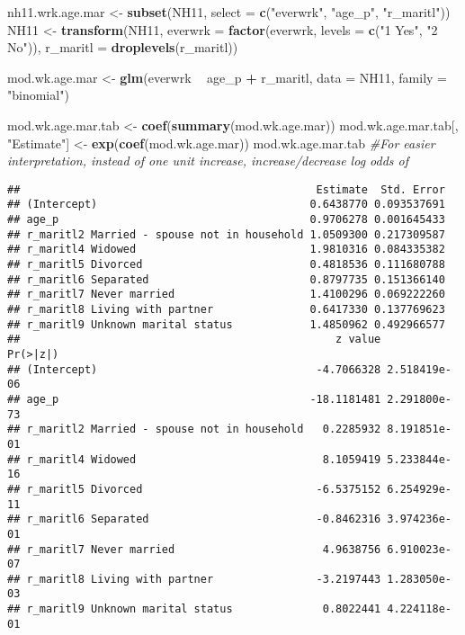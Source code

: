 \documentclass[]{article}
\newenvironment{Shaded}{\begin{snugshade}}{\end{snugshade}}
\newcommand{\KeywordTok}[1]{\textcolor[rgb]{0.13,0.29,0.53}{\textbf{#1}}}
\newcommand{\DataTypeTok}[1]{\textcolor[rgb]{0.13,0.29,0.53}{#1}}
\newcommand{\StringTok}[1]{\textcolor[rgb]{0.31,0.60,0.02}{#1}}
\newcommand{\CommentTok}[1]{\textcolor[rgb]{0.56,0.35,0.01}{\textit{#1}}}
\newcommand{\OperatorTok}[1]{\textcolor[rgb]{0.81,0.36,0.00}{\textbf{#1}}}
\newcommand{\NormalTok}[1]{#1}
\begin{document}
\begin{Shaded}
\begin{Highlighting}[]
\NormalTok{nh11.wrk.age.mar <-}\StringTok{ }\KeywordTok{subset}\NormalTok{(NH11, }\DataTypeTok{select =} \KeywordTok{c}\NormalTok{(}\StringTok{"everwrk"}\NormalTok{, }\StringTok{"age_p"}\NormalTok{, }\StringTok{"r_maritl"}\NormalTok{))}
\NormalTok{NH11 <-}\StringTok{ }\KeywordTok{transform}\NormalTok{(NH11,}
                  \DataTypeTok{everwrk =} \KeywordTok{factor}\NormalTok{(everwrk,}
                                   \DataTypeTok{levels =} \KeywordTok{c}\NormalTok{(}\StringTok{"1 Yes"}\NormalTok{, }\StringTok{"2 No"}\NormalTok{)),}
                  \DataTypeTok{r_maritl =} \KeywordTok{droplevels}\NormalTok{(r_maritl))}

\NormalTok{mod.wk.age.mar <-}\StringTok{ }\KeywordTok{glm}\NormalTok{(everwrk }\OperatorTok{~}\StringTok{ }\NormalTok{age_p }\OperatorTok{+}\StringTok{ }\NormalTok{r_maritl, }\DataTypeTok{data =}\NormalTok{ NH11,}
                      \DataTypeTok{family =} \StringTok{"binomial"}\NormalTok{)}

\NormalTok{mod.wk.age.mar.tab <-}\StringTok{ }\KeywordTok{coef}\NormalTok{(}\KeywordTok{summary}\NormalTok{(mod.wk.age.mar))}
\NormalTok{mod.wk.age.mar.tab[, }\StringTok{"Estimate"}\NormalTok{] <-}\StringTok{ }\KeywordTok{exp}\NormalTok{(}\KeywordTok{coef}\NormalTok{(mod.wk.age.mar))}
\NormalTok{mod.wk.age.mar.tab }\CommentTok{#For easier interpretation, instead of one unit increase, increase/decrease log odds of}
\end{Highlighting}
\end{Shaded}

\begin{verbatim}
##                                              Estimate  Std. Error
## (Intercept)                                 0.6438770 0.093537691
## age_p                                       0.9706278 0.001645433
## r_maritl2 Married - spouse not in household 1.0509300 0.217309587
## r_maritl4 Widowed                           1.9810316 0.084335382
## r_maritl5 Divorced                          0.4818536 0.111680788
## r_maritl6 Separated                         0.8797735 0.151366140
## r_maritl7 Never married                     1.4100296 0.069222260
## r_maritl8 Living with partner               0.6417330 0.137769623
## r_maritl9 Unknown marital status            1.4850962 0.492966577
##                                                 z value     Pr(>|z|)
## (Intercept)                                  -4.7066328 2.518419e-06
## age_p                                       -18.1181481 2.291800e-73
## r_maritl2 Married - spouse not in household   0.2285932 8.191851e-01
## r_maritl4 Widowed                             8.1059419 5.233844e-16
## r_maritl5 Divorced                           -6.5375152 6.254929e-11
## r_maritl6 Separated                          -0.8462316 3.974236e-01
## r_maritl7 Never married                       4.9638756 6.910023e-07
## r_maritl8 Living with partner                -3.2197443 1.283050e-03
## r_maritl9 Unknown marital status              0.8022441 4.224118e-01
\end{verbatim}
\end{document}

